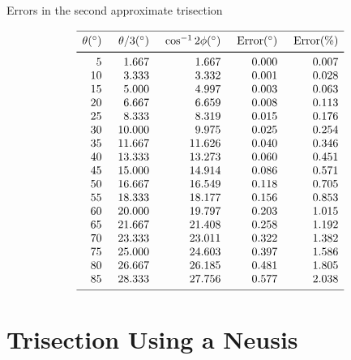 \begin{table}[t]
\caption{Errors in the second approximate trisection}\label{t.trisect-second-approx}
\[
%
\begin{array}{r@{\hspace{5mm}}r@{\hspace{5mm}}r@{\hspace{5mm}}r@{\hspace{5mm}}r}
\hline
\noalign{\smallskip}
\theta ({}^\circ) & \theta/3 ({}^\circ)& \cos^{-1} 2\phi ({}^\circ) & \mathrm{Error} ({}^\circ) & \mathrm{Error (\%)}\\
\noalign{\smallskip}\svhline\noalign{\smallskip}
  5 &    1.667 &    1.667  &     0.000 &    0.007 \\
 10 &    3.333 &    3.332  &     0.001 &    0.028 \\
 15 &    5.000 &    4.997  &     0.003 &    0.063 \\
 20 &    6.667 &    6.659  &     0.008 &    0.113 \\
 25 &    8.333 &    8.319  &     0.015 &    0.176 \\
 30 &   10.000 &    9.975  &     0.025 &    0.254 \\
 35 &   11.667 &   11.626  &     0.040 &    0.346 \\
 40 &   13.333 &   13.273  &     0.060 &    0.451 \\
 45 &   15.000 &   14.914  &     0.086 &    0.571 \\
 50 &   16.667 &   16.549  &     0.118 &    0.705 \\
 55 &   18.333 &   18.177  &     0.156 &    0.853 \\
 60 &   20.000 &   19.797  &     0.203 &    1.015 \\
 65 &   21.667 &   21.408  &     0.258 &    1.192 \\
 70 &   23.333 &   23.011  &     0.322 &    1.382 \\
 75 &   25.000 &   24.603  &     0.397 &    1.586 \\
 80 &   26.667 &   26.185  &     0.481 &    1.805 \\
 85 &   28.333 &   27.756  &     0.577 &    2.038 \\
 \noalign{\smallskip}
 \hline
 \end{array}
\]
\end{table}



\newpage

\section{Trisection Using a Neusis}\label{s.neusis}

